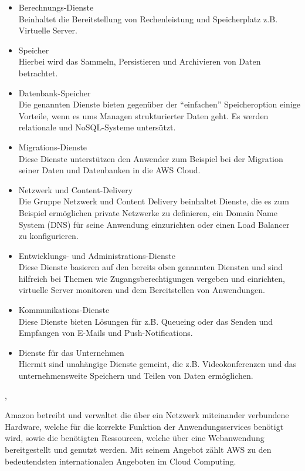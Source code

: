 \begin{itemize}
  \item Berechnungs-Dienste \\
  Beinhaltet die Bereitstellung von Rechenleistung und Speicherplatz z.B. Virtuelle Server.
  \item Speicher \\
  Hierbei wird das Sammeln, Persistieren und Archivieren von Daten betrachtet.
  \item Datenbank-Speicher \\
  Die genannten Dienste bieten gegenüber der "`einfachen"' Speicheroption einige Vorteile, wenn es ums Managen strukturierter Daten geht. Es werden relationale und NoSQL-Systeme untersützt.
  \item Migrations-Dienste \\
  Diese Dienste unterstützen den Anwender zum Beispiel bei der Migration seiner Daten und Datenbanken in die AWS Cloud.
  \item Netzwerk und Content-Delivery \\
  Die Gruppe Netzwerk und Content Delivery beinhaltet Dienste, die es zum Beispiel ermöglichen private Netzwerke zu definieren, ein Domain Name System (DNS) für seine Anwendung einzurichten oder einen Load Balancer zu konfigurieren.
  \item Entwicklungs- und Administrations-Dienste \\
  Diese Dienste basieren auf den bereits oben genannten Diensten und sind hilfreich bei Themen wie Zugangsberechtigungen vergeben und einrichten, virtuelle Server monitoren und dem Bereitstellen von Anwendungen.
  \item Kommunikations-Dienste
  \\ Diese Dienste bieten Lösungen für z.B. Queueing oder das Senden und Empfangen von E-Mails und Push-Notifications.
  \item Dienste für das Unternehmen
  \\ Hiermit sind unahängige Dienste gemeint, die z.B. Videokonferenzen und das unternehmensweite Speichern und Teilen von Daten ermöglichen.
\end{itemize} \cite{wittig:awsinaction}, \cite{aws:products}

Amazon betreibt und verwaltet
die über ein Netzwerk miteinander verbundene Hardware, welche für die korrekte
Funktion der Anwendungsservices benötigt wird, sowie die benötigten Ressourcen,
welche über eine Webanwendung bereitgestellt und genutzt werden. Mit seinem Angebot zählt AWS zu den bedeutendsten internationalen Angeboten im Cloud Computing.


